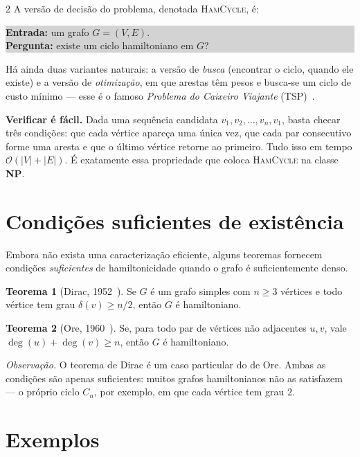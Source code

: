 \documentclass[10pt,a4paper]{article}
\theoremstyle{definition}
\newtheorem{teo}{Teorema}
\newcommand{\guidebox}[1]{%
  \smallskip
  \noindent\colorbox{lightgray}{\parbox{\linewidth-2\fboxsep}{\small #1}}
  \smallskip
}
\begin{document}
\begin{multicols}{2}
A versão de decisão do problema, denotada \textsc{HamCycle}, é:

\guidebox{%
\textbf{Entrada:} um grafo $G = (V, E)$.\\
\textbf{Pergunta:} existe um ciclo hamiltoniano em $G$?
}

Há ainda duas variantes naturais: a versão de \emph{busca} (encontrar o ciclo, quando ele existe) e a versão de \emph{otimização}, em que arestas têm pesos e busca-se um ciclo de custo mínimo --- esse é o famoso \emph{Problema do Caixeiro Viajante} (\textsc{TSP})~\citep{cormen2012,dasgupta2009}.

\smallskip
\noindent\textbf{Verificar é fácil.} Dada uma sequência candidata $v_1, v_2, \ldots, v_n, v_1$, basta checar três condições: que cada vértice apareça uma única vez, que cada par consecutivo forme uma aresta e que o último vértice retorne ao primeiro. Tudo isso em tempo $\mathcal{O}(|V|+|E|)$. É exatamente essa propriedade que coloca \textsc{HamCycle} na classe \textbf{NP}.

\section{Condições suficientes de existência}

Embora não exista uma caracterização eficiente, alguns teoremas fornecem condições \emph{suficientes} de hamiltonicidade quando o grafo é suficientemente denso.

\begin{teo}[Dirac, 1952~\citep{dirac1952}]
Se $G$ é um grafo simples com $n \geq 3$ vértices e todo vértice tem grau $\delta(v) \geq n/2$, então $G$ é hamiltoniano.
\end{teo}

\begin{teo}[Ore, 1960~\citep{ore1960}]
Se, para todo par de vértices não adjacentes $u, v$, vale $\deg(u) + \deg(v) \geq n$, então $G$ é hamiltoniano.
\end{teo}

\textit{Observação.} O teorema de Dirac é um caso particular do de Ore. Ambas as condições são apenas suficientes: muitos grafos hamiltonianos não as satisfazem --- o próprio ciclo $C_n$, por exemplo, em que cada vértice tem grau $2$.

\section{Exemplos}


\end{multicols}
\end{document}
